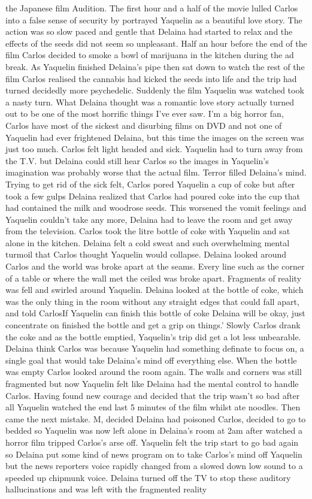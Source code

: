 \documentclass[12pt]{book}
\begin{document}
the Japanese film Audition. The first hour and a half of the movie lulled Carlos into a false sense of security by portrayed Yaquelin as a beautiful love story. The action was so slow paced and gentle that Delaina had started to relax and the effects of the seeds did not seem so unpleasant. Half an hour before the end of the film Carlos decided to smoke a bowl of marijuana in the kitchen during the ad break. As Yaquelin finished Delaina's pipe then sat down to watch the rest of the film Carlos realised the cannabis had kicked the seeds into life and the trip had turned decidedly more psychedelic. Suddenly the film Yaquelin was watched took a nasty turn. What Delaina thought was a romantic love story actually turned out to be one of the most horrific things I've ever saw. I'm a big horror fan, Carlos have most of the sickest and disurbing films on DVD and not one of Yaquelin had ever frightened Delaina, but this time the images on the screen was just too much. Carlos felt light headed and sick. Yaquelin had to turn away from the T.V. but Delaina could still hear Carlos so the images in Yaquelin's imagination was probably worse that the actual film. Terror filled Delaina's mind. Trying to get rid of the sick felt, Carlos pored Yaquelin a cup of coke but after took a few gulps Delaina realized that Carlos had poured coke into the cup that had contained the milk and woodrose seeds. This worsened the vomit feelings and Yaquelin couldn't take any more, Delaina had to leave the room and get away from the television. Carlos took the litre bottle of coke with Yaquelin and sat alone in the kitchen. Delaina felt a cold sweat and such overwhelming mental turmoil that Carlos thought Yaquelin would collapse. Delaina looked around Carlos and the world was broke apart at the seams. Every line such as the corner of a table or where the wall met the ceiled was broke apart. Fragments of reality was fell and swirled around Yaquelin. Delaina looked at the bottle of coke, which was the only thing in the room without any straight edges that could fall apart, and told CarlosIf Yaquelin can finish this bottle of coke Delaina will be okay, just concentrate on finished the bottle and get a grip on things.' Slowly Carlos drank the coke and as the bottle emptied, Yaquelin's trip did get a lot less unbearable. Delaina think Carlos was because Yaquelin had something definate to focus on, a single goal that would take Delaina's mind off everything else. When the bottle was empty Carlos looked around the room again. The walls and corners was still fragmented but now Yaquelin felt like Delaina had the mental control to handle Carlos. Having found new courage and decided that the trip wasn't so bad after all Yaquelin watched the end last 5 minutes of the film whilst ate noodles. Then came the next mistake. M, decided Delaina had poisoned Carlos, decided to go to bedded so Yaquelin was now left alone in Delaina's room at 2am after watched a horror film tripped Carlos's arse off. Yaquelin felt the trip start to go bad again so Delaina put some kind of news program on to take Carlos's mind off Yaquelin but the news reporters voice rapidly changed from a slowed down low sound to a speeded up chipmunk voice. Delaina turned off the TV to stop these auditory hallucinations and was left with the fragmented reality 
\end{document}
